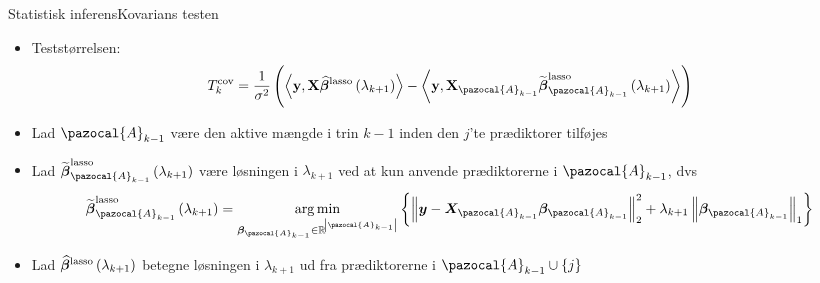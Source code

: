 \begin{frame}{Statistisk inferens}{Kovarians testen}
\begin{itemize}
\item Teststørrelsen:
 \begin{align*}
T_k^{\text{cov}} = \frac{1}{\sigma^2}\del{ \left\langle \textbf{y}, \textbf{X} \widehat{\boldsymbol{\beta}}^\text{lasso} \del{\lambda_{k+1}} \right\rangle -  \left\langle  \textbf{y}, \textbf{X}_{\pazocal{A}_{k-1}} \widetilde{\boldsymbol{{\beta}}}^\text{lasso}_{\pazocal{A}_{k-1}} \del{\lambda_{k+1}} \right\rangle}
\end{align*}
\item Lad $\pazocal{A}_{k-1}$ være den aktive mængde i trin $k-1$ inden den $j$'te prædiktorer tilføjes
\item  Lad $\widetilde{\boldsymbol{{\beta}}}^{\text{lasso}}_{\pazocal{A}_{k-1}} \del{\lambda_{k+1}}$ være løsningen i $\lambda_{k+1}$ ved at kun anvende prædiktorerne i $\pazocal{A}_{k-1}$, dvs 
\begin{align*}
\widetilde{\boldsymbol{{\beta}}}^{\text{lasso}}_{\pazocal{A}_{k-1}} \del{\lambda_{k+1}} = 
\underset{\boldsymbol{\beta}_{\pazocal{A}_{k-1}} \in \mathbb{R}^{\abs{\pazocal{A}_{k-1}}} }{\arg\min} \cbr{\left\Vert \vy - \vX_{\pazocal{A}_{k-1}} \boldsymbol\beta_{\pazocal{A}_{k-1}} \right\Vert^2_2 + \lambda_{k+1} \left\Vert \boldsymbol\beta_{\pazocal{A}_{k-1}}  \right\Vert_1}
\end{align*}
\item  Lad $\boldsymbol{\widehat{\beta}}^{\text{lasso}} \del{\lambda_{k+1}}$ betegne løsningen i $\lambda_{k+1}$ ud fra prædiktorerne i   $\pazocal{A}_{k-1} \cup \cbr{j}$
\end{itemize}
\end{frame}

